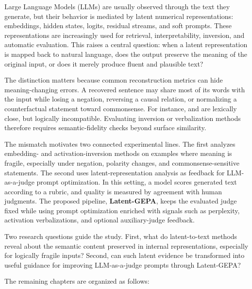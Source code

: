\documentclass[12pt,a4paper,twoside,openright]{book}
\begin{document}
Large Language Models (LLMs) are usually observed through the text they generate,
but their behavior is mediated by latent numerical representations: embeddings,
hidden states, logits, residual streams, and soft prompts. These representations
are increasingly used for retrieval, interpretability, inversion, and automatic
evaluation. This raises a central question: when a latent
representation is mapped back to natural language, does the output preserve the
meaning of the original input, or does it merely produce fluent and plausible
text?

The distinction matters because common reconstruction metrics can hide
meaning-changing errors. A recovered sentence may share most of its words with
the input while losing a negation, reversing a causal relation, or normalizing a
counterfactual statement toward commonsense. For instance,
 and  are lexically close, but logically incompatible. Evaluating inversion
or verbalization methods therefore requires semantic-fidelity checks beyond
surface similarity.

The mismatch motivates two connected experimental lines. The first analyzes
embedding- and activation-inversion methods on examples where meaning is
fragile, especially under negation, polarity changes, and commonsense-sensitive
statements. The second uses latent-representation analysis as feedback for
LLM-as-a-judge prompt optimization. In this setting, a model scores generated
text according to a rubric, and quality is measured by agreement with human
judgments. The proposed pipeline, \textbf{Latent-GEPA}, keeps the evaluated
judge fixed while using prompt optimization enriched with signals such as
perplexity, activation verbalizations, and optional auxiliary-judge feedback.

Two research questions guide the study. First, what do latent-to-text
methods reveal about the semantic content preserved in internal
representations, especially for logically fragile inputs? Second, can such
latent evidence be transformed into useful guidance for improving
LLM-as-a-judge prompts through Latent-GEPA?

The remaining chapters are organized as follows:

\vspace{4mm}
\end{document}
